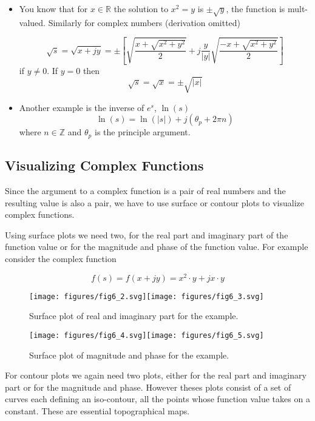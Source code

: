 \documentclass{article}
\begin{document}
\begin{itemize}
\item You know that for $x\in\mathbb{R}$ the solution to $x^2 = y$ is $\pm \sqrt{y}$, the function is mult-valued. Similarly for complex numbers (derivation omitted)

  \[
  \sqrt{s} = \sqrt{x + jy} = \pm \left[\sqrt{\frac{x + \sqrt{x^2 + y^2}}{2}} + j\frac{y}{|y|} \sqrt{\frac{-x + \sqrt{x^2 + y^2}}{2}}\right] 
  \]
  if $y \neq 0$. If $y = 0$ then
  \[
  \sqrt{s} = \sqrt{x} = \pm \sqrt{|x|}
  \]
  
\item Another example is the inverse of $e^s$, $\ln(s)$
  \[
  \ln(s) = \ln(|s|) + j(\theta_p + 2\pi n)  
  \]
  where $n\in\mathbb{Z}$ and $\theta_p$ is the principle argument.
\end{itemize}

\subsection{Visualizing Complex Functions}

Since the argument to a complex function is a pair of real numbers and the resulting value is also a pair, we have to use surface or contour plots to visualize complex functions.

Using surface plots we need two, for the real part and imaginary part of the function value or for the magnitude and phase of the function value. For example consider the complex function

\[
f(s) = f(x + jy) = x^2\cdot y + jx\cdot y
\]

\begin{figure}
  \centering
  \texttt{[image: figures/fig6\_2.svg]}\texttt{[image: figures/fig6\_3.svg]}
  \caption{Surface plot of real and imaginary part for the example.}
\end{figure}

\begin{figure}
  \centering
  \texttt{[image: figures/fig6\_4.svg]}\texttt{[image: figures/fig6\_5.svg]}
  \caption{Surface plot of magnitude and phase for the example.}
\end{figure}

For contour plots we again need two plots, either for the real part and imaginary part or for the magnitude and phase. However theses plots consist of a set of curves each defining an iso-contour, all the points whose function value takes on a constant. These are essential topographical maps.
\end{document}
